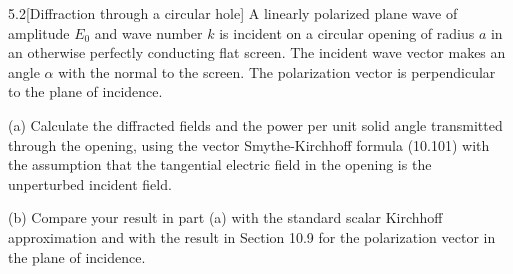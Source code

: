 \documentclass[12pt]{article}
\begin{document}
\begin{problem}{5.2}[Diffraction through a circular hole]
A linearly polarized plane wave of amplitude $E_0$ and wave number $k$ is
incident on a circular opening of radius $a$ in an otherwise perfectly
conducting flat screen. The incident wave vector makes an angle $\alpha$ with
the normal to the screen. The polarization vector is perpendicular to the plane
of incidence.

(a) Calculate the diffracted fields and the power per unit solid angle
transmitted through the opening, using the vector Smythe-Kirchhoff formula
(10.101) with the assumption that the tangential electric field in the opening
is the unperturbed incident field.

(b) Compare your result in part (a) with the standard scalar Kirchhoff
approximation and with the result in Section 10.9 for the polarization vector in
the plane of incidence.


\end{problem}
\end{document}
